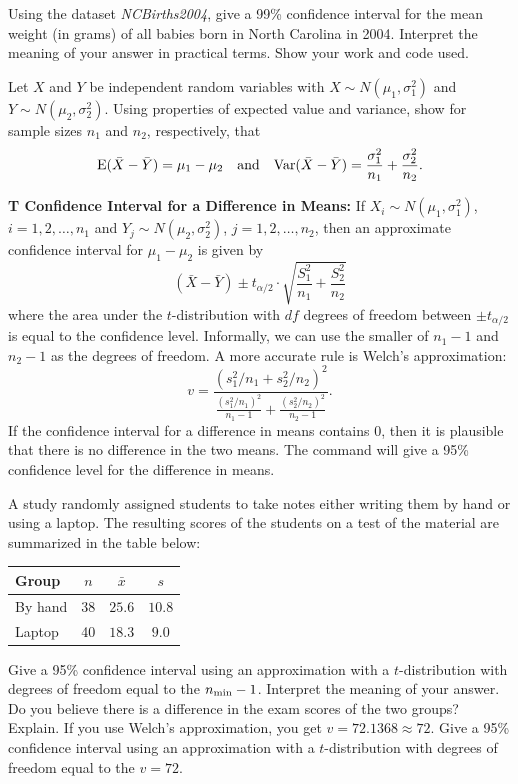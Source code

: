 \clearpage
{}

\bb[resume]
\ii Using the dataset \textit{NCBirths2004}, give a 99\% confidence interval for the mean weight (in grams) of all babies born in North Carolina in 2004. Interpret the meaning of your answer in practical terms. Show your work and code used. 
\ee

\vfill


\bb[resume]
\ii Let $X$ and $Y$ be independent random variables with $X \sim N(\mu_1, \sigma_1^2)$ and $Y \sim N(\mu_2, \sigma_2^2)$. Using properties of expected value and variance, show for sample sizes $n_1$ and $n_2$, respectively, that
\[ \mbox{E}(\bar{X}-\bar{Y}) = \mu_1-\mu_2 \ \ \ \mbox{and} \ \ \ \mbox{Var}(\bar{X}-\bar{Y}) = \frac{\sigma_1^2}{n_1} +  \frac{\sigma_2^2}{n_2}.\]
\ee

\vfill

\bbox
\textbf{T Confidence Interval for a Difference in Means:} If $X_i \sim N(\mu_1, \sigma_1^2)$, $i=1,2,\ldots , n_1$ and $Y_j \sim N(\mu_2, \sigma_2^2)$, $j=1,2,\ldots , n_2$, then an approximate confidence interval for $\mu_1 - \mu_2$ is given by
\[ (\bar{X} - \bar{Y}) \pm  t_{\alpha/2} \cdot  \sqrt{\frac{S_1^2}{n_1} +  \frac{S_2^2}{n_2}}\]
where the area under the $t$-distribution with $df$ degrees of freedom between $\pm t_{\alpha/2}$ is equal to the confidence level.
\bi
\ii Informally, we can use the smaller of $n_1-1$ and $n_2-1$ as the degrees of freedom.
\ii A more accurate rule is Welch's approximation:
\[ v = \frac{\left( s_1^2/n_1+ s_2^2/n_2 \right)^2}{ \frac{(s_1^2/n_1)^2}{n_1-1} + \frac{(s_2^2/n_2)^2}{n_2-1}}.\]
\ii If the confidence interval for a difference in means contains $0$, then it is plausible that there is no difference in the two means.
\ii The command  will give a 95\% confidence level for the difference in means.
\ei
\ebox


\bb[resume]
\ii A study randomly assigned students to take notes either writing them by hand or using a laptop. The resulting scores of the students on a test of the material are summarized in the table below:
\begin{center}
\begin{tabular}{lccc}
\hline
Group & $n$ & $\bar{x}$ & $s$ \\
\hline
By hand & 38 & $25.6$ & $10.8$\\
Laptop & 40 & $18.3$ & $9.0$\\
\end{tabular}
\end{center}
\bb
\ii Give a 95\% confidence interval using an approximation with a $t$-distribution with degrees of freedom equal to the $n_{\rm min} -1$. \vfill
\ii Interpret the meaning of your answer. Do you believe there is a difference in the exam scores of the two groups? Explain. \vspace{1.5in}
\ii If you use Welch's approximation, you get $v = 72.1368 \approx 72$. Give a 95\% confidence interval using an approximation with a $t$-distribution with degrees of freedom equal to the $v=72$. \vfill
\ee 

\ee
